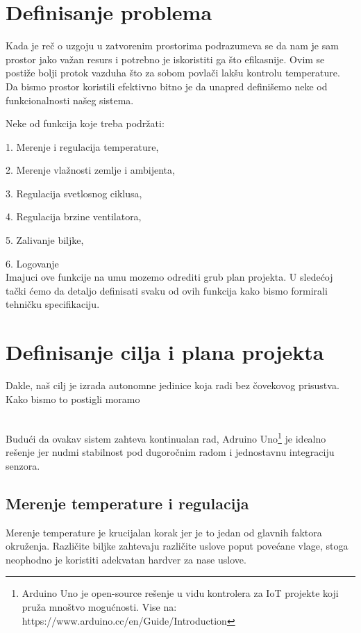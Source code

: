 \documentclass[a4paper,11pt]{book}
\makeatletter
\newenvironment{chapquote}[2][2em]
  {\setlength{\@tempdima}{#1}%
   \def\chapquote@author{#2}%
   \parshape 1 \@tempdima \dimexpr\textwidth-2\@tempdima\relax%
   \itshape}
  {\par\normalfont\hfill--\ \chapquote@author\hspace*{\@tempdima}\par\bigskip}
\makeatother
\begin{document}

\section{Definisanje problema}
Kada je reč o uzgoju u zatvorenim prostorima podrazumeva se da nam je sam prostor jako važan resurs i potrebno je iskoristiti ga što efikasnije. Ovim se postiže bolji protok vazduha što za sobom povlači lakšu kontrolu temperature.  \\

Da bismo prostor koristili efektivno bitno je da unapred definišemo neke od funkcionalnosti našeg sistema. 

Neke od funkcija koje treba podržati:

1. Merenje i regulacija temperature,

2. Merenje vlažnosti zemlje i ambijenta,

3. Regulacija svetlosnog ciklusa,

4. Regulacija brzine ventilatora,

5. Zalivanje biljke,

6. Logovanje \\ 

\noindent Imajuci ove funkcije na umu mozemo odrediti grub plan projekta. U sledećoj tački ćemo da detaljo definisati svaku od ovih funkcija kako bismo formirali tehničku specifikaciju.

\section{Definisanje cilja i plana projekta}
Dakle, naš cilj je izrada autonomne jedinice koja radi bez čovekovog prisustva. Kako bismo to postigli moramo 

\noindent \\ Budući da ovakav sistem zahteva kontinualan rad, Adruino Uno\footnote{Arduino Uno je open-source rešenje u vidu kontrolera za IoT projekte koji pruža mnoštvo mogućnosti. Vise na: https://www.arduino.cc/en/Guide/Introduction} je idealno rešenje jer nudmi stabilnost pod dugoročnim radom i jednostavnu integraciju senzora.

\subsection{Merenje temperature i regulacija}
Merenje temperature je krucijalan korak jer je to jedan od glavnih faktora okruženja. Različite biljke zahtevaju različite uslove poput povećane vlage, stoga neophodno je koristiti adekvatan hardver za nase uslove. 
\end{document}
